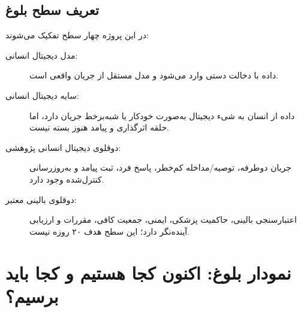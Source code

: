 \documentclass[11pt,a4paper]{article}
\begin{document}
\subsection{تعریف سطح بلوغ}
در این پروژه چهار سطح تفکیک می‌شوند:
\begin{description}
  \item[مدل دیجیتال انسانی:] داده با دخالت دستی وارد می‌شود و مدل مستقل از جریان واقعی است.
  \item[سایه دیجیتال انسانی:] داده از انسان به شیء دیجیتال به‌صورت خودکار یا شبه‌برخط جریان دارد، اما حلقه اثرگذاری و پیامد هنوز بسته نیست.
  \item[دوقلوی دیجیتال انسانی پژوهشی:] جریان دوطرفه، توصیه/مداخله کم‌خطر، پاسخ فرد، ثبت پیامد و به‌روزرسانی کنترل‌شده وجود دارد.
  \item[دوقلوی بالینی معتبر:] اعتبارسنجی بالینی، حاکمیت پزشکی، ایمنی، جمعیت کافی، مقررات و ارزیابی آینده‌نگر دارد؛ این سطح هدف ۲۰ روزه نیست.
\end{description}

\section{نمودار بلوغ: اکنون کجا هستیم و کجا باید برسیم؟}
\end{document}
